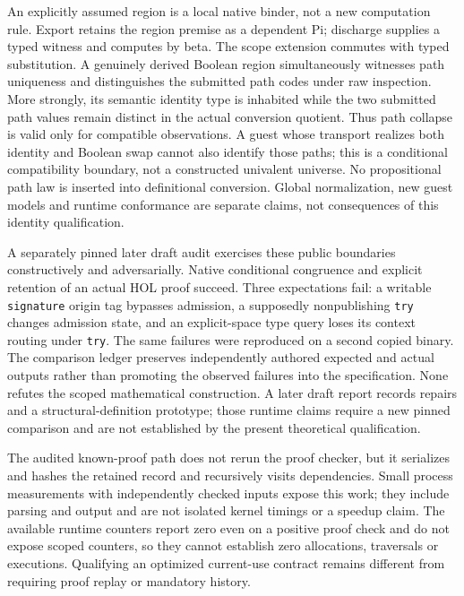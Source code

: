 \documentclass[11pt]{article}
\theoremstyle{definition}
\theoremstyle{remark}
\begin{document}
An explicitly assumed region is a local native binder, not a new computation
rule. Export retains the region premise as a dependent Pi; discharge supplies
a typed witness and computes by beta. The scope extension commutes with typed
substitution. A genuinely derived Boolean region simultaneously witnesses path
uniqueness and distinguishes the submitted path codes under raw inspection.
More strongly, its semantic identity type is inhabited while the two submitted
path values remain distinct in the actual conversion quotient.
Thus path collapse is valid only for compatible observations. A guest whose
transport realizes both identity and Boolean swap cannot also identify those
paths; this is a conditional compatibility boundary, not a constructed
univalent universe. No propositional path law is inserted into definitional
conversion. Global normalization, new guest models and runtime conformance are
separate claims, not consequences of this identity qualification.

A separately pinned later draft audit exercises these public boundaries
constructively and adversarially. Native conditional congruence and explicit
retention of an actual HOL proof succeed. Three expectations fail: a writable
\texttt{signature} origin tag bypasses admission, a supposedly nonpublishing
\texttt{try} changes admission state, and an explicit-space type query loses
its context routing under \texttt{try}. The same failures were reproduced on
a second copied binary. The comparison ledger preserves independently authored
expected and actual outputs rather than promoting the observed failures into
the specification. None refutes the scoped mathematical construction. A later
draft report records repairs and a structural-definition prototype; those
runtime claims require a new pinned comparison and are not established by
the present theoretical qualification.

The audited known-proof path does not rerun the proof checker, but it serializes
and hashes the retained record and recursively visits dependencies. Small
process measurements with independently checked inputs expose this work;
they include parsing and output and are not isolated kernel timings or a
speedup claim. The available runtime counters report zero even on a positive
proof check and do not expose scoped counters, so they cannot establish
zero allocations, traversals or executions. Qualifying an optimized current-use
contract remains different from requiring proof replay or mandatory history.
\end{document}
